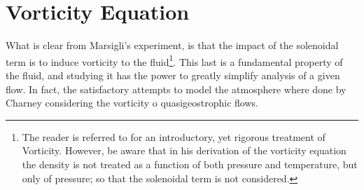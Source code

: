 \section{Vorticity Equation}
\label{s:vorticity}
What is clear from Marsigli's experiment, is that the impact of the solenoidal term is to induce vorticity to the fluid\footnote{The reader is referred to  for an introductory, yet rigorous treatment of Vorticity. However, be aware that in his derivation of the vorticity equation the density is not treated as a function of both pressure and temperature, but only of pressure; so that the solenoidal term is not considered.}. This last is a fundamental property of the fluid, and studying it has the power to greatly simplify analysis of a given flow. In fact, the satisfactory attempts to model the atmosphere where done by Charney considering the vorticity o quasigeostrophic flows.

